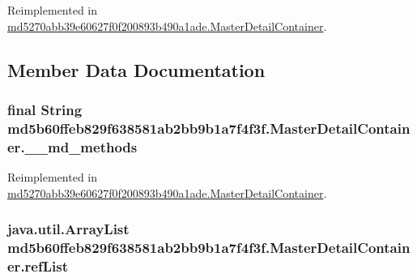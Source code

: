 Reimplemented in \hyperlink{classmd5270abb39e60627f0f200893b490a1ade_1_1_master_detail_container_f60c6a5b4b46f56b41eb0cd825f110de}{md5270abb39e60627f0f200893b490a1ade.MasterDetailContainer}.

\subsection{Member Data Documentation}
\hypertarget{classmd5b60ffeb829f638581ab2bb9b1a7f4f3f_1_1_master_detail_container_556c7fb30e166beeb9cd843dea89366f}{
\subsubsection[{\_\-\_\-md\_\-methods}]{\setlength{\rightskip}{0pt plus 5cm}final String {\bf md5b60ffeb829f638581ab2bb9b1a7f4f3f.MasterDetailContainer.\_\-\_\-md\_\-methods}}}
\label{classmd5b60ffeb829f638581ab2bb9b1a7f4f3f_1_1_master_detail_container_556c7fb30e166beeb9cd843dea89366f}




Reimplemented in \hyperlink{classmd5270abb39e60627f0f200893b490a1ade_1_1_master_detail_container_c82bf846b500c62b8736305937c47350}{md5270abb39e60627f0f200893b490a1ade.MasterDetailContainer}.\hypertarget{classmd5b60ffeb829f638581ab2bb9b1a7f4f3f_1_1_master_detail_container_b2c4d24cca5bde061bd6ca0b037af523}{
\subsubsection[{refList}]{\setlength{\rightskip}{0pt plus 5cm}java.util.ArrayList {\bf md5b60ffeb829f638581ab2bb9b1a7f4f3f.MasterDetailContainer.refList}}}
\label{classmd5b60ffeb829f638581ab2bb9b1a7f4f3f_1_1_master_detail_container_b2c4d24cca5bde061bd6ca0b037af523}




